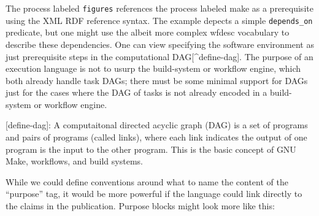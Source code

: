 \documentclass[manuscript,authordraft]{acmart}
\begin{document}
\normalsize

The process labeled \texttt{figures} references the process labeled make
as a prerequisite using the XML RDF reference syntax. The example
depects a simple \texttt{depends\_on} predicate, but one might use the
albeit more complex wfdesc vocabulary to describe these dependencies.
One can view specifying the software environment as just prerequisite
steps in the computational DAG{[}\^{}define-dag{]}. The purpose of an
execution language is not to usurp the build-system or workflow engine,
which both already handle task DAGs; there must be some minimal support
for DAGs just for the cases where the DAG of tasks is not already
encoded in a build-system or workflow engine.

{[}define-dag{]}: A computaitonal directed acyclic graph (DAG) is a set
of programs and pairs of programs (called links), where each link
indicates the output of one program is the input to the other program.
This is the basic concept of GNU Make, workflows, and build systems.

While we could define conventions around what to name the content of the
``purpose'' tag, it would be more powerful if the language could link
directly to the claims in the publication. Purpose blocks might look
more like this:

\small
\end{document}
